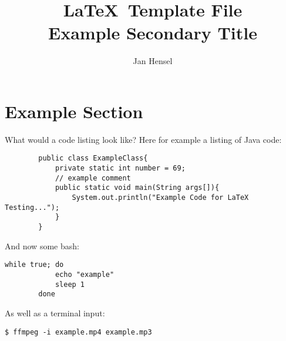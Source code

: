 \documentclass{article}
\author{Jan Hensel}
\title{\textbf{\LaTeX\ Template File}\\
        Example Secondary Title}
\begin{document}
\maketitle
\section{Example Section}
    What would a code listing look like? Here for example a listing of Java code: 
    \begin{lstlisting}
        public class ExampleClass{
            private static int number = 69; 
            // example comment 
            public static void main(String args[]){
                System.out.println("Example Code for LaTeX Testing...");
            }
        }
    \end{lstlisting}

    And now some bash: 
    \begin{lstlisting}[style=bash]
		while true; do
			echo "example" 
			sleep 1
		done
    \end{lstlisting}
    As well as a terminal input: 
    \begin{lstlisting}[style=terminal]
        $ ffmpeg -i example.mp4 example.mp3
    \end{lstlisting}
    
\end{document}
